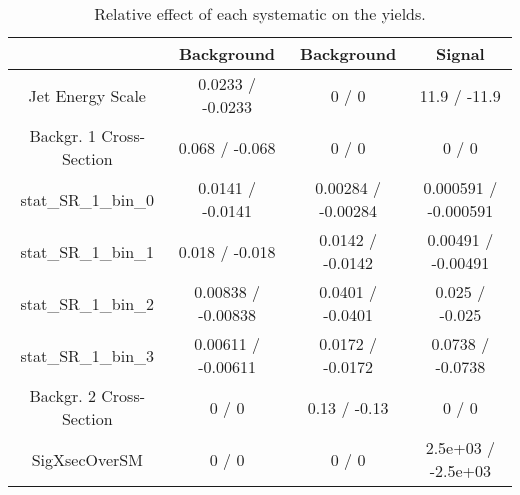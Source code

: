 \documentclass[10pt]{article}
\begin{document}
\begin{table}[htbp]
\begin{center}
\begin{tabular}{|c|c|c|c|}
\hline 
      & Background      & Background      & Signal \\ 
\hline 
  Jet Energy Scale & 0.0233 / -0.0233 & 0 / 0 & 11.9 / -11.9 \\ 
  Backgr. 1 Cross-Section & 0.068 / -0.068 & 0 / 0 & 0 / 0 \\ 
 stat_SR_1_bin_0 & 0.0141 / -0.0141 & 0.00284 / -0.00284 & 0.000591 / -0.000591 \\ 
 stat_SR_1_bin_1 & 0.018 / -0.018 & 0.0142 / -0.0142 & 0.00491 / -0.00491 \\ 
 stat_SR_1_bin_2 & 0.00838 / -0.00838 & 0.0401 / -0.0401 & 0.025 / -0.025 \\ 
 stat_SR_1_bin_3 & 0.00611 / -0.00611 & 0.0172 / -0.0172 & 0.0738 / -0.0738 \\ 
  Backgr. 2 Cross-Section & 0 / 0 & 0.13 / -0.13 & 0 / 0 \\ 
 SigXsecOverSM & 0 / 0 & 0 / 0 & 2.5e+03 / -2.5e+03 \\ 
\hline 
\end{tabular} 
\caption{Relative effect of each systematic on the yields.} 
\end{center} 
\end{table} 
\end{document}
